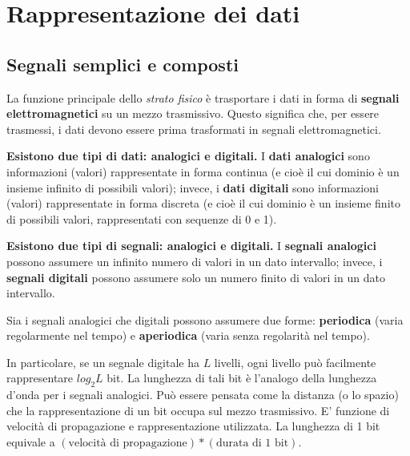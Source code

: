 \section{Rappresentazione dei dati}

    \subsection{Segnali semplici e composti}
    
        La funzione principale dello \textit{strato fisico} è trasportare i dati in forma di \textbf{segnali elettromagnetici} su un mezzo trasmissivo. Questo significa che, per essere trasmessi, i dati devono essere prima trasformati in segnali elettromagnetici.
        
        \vspace{3mm}
        
       \textbf{ Esistono due tipi di dati: analogici e digitali.} I \textbf{dati analogici} sono informazioni (valori) rappresentate in forma continua (e cioè il cui dominio è un insieme infinito di possibili valori); invece, i \textbf{dati digitali} sono informazioni (valori) rappresentate in forma discreta (e cioè il cui dominio è un insieme finito di possibili valori, rappresentati con sequenze di 0 e 1).
        
        \vspace{3mm}
        
        \textbf{Esistono due tipi di segnali: analogici e digitali.} I \textbf{segnali analogici} possono assumere un infinito numero di valori in un dato intervallo; invece, i \textbf{segnali digitali} possono assumere solo un numero finito di valori in un dato intervallo.
        
        \vspace{3mm}
        
        Sia i segnali analogici che digitali possono assumere due forme: \textbf{periodica} (varia regolarmente nel tempo) e \textbf{aperiodica} (varia senza regolarità nel tempo).
        
        \vspace{3mm}
        
        In particolare, se un segnale digitale ha \(L\) livelli, ogni livello può facilmente rappresentare \(log_2 L\) bit. La lunghezza di tali bit è l'analogo della lunghezza d'onda per i segnali analogici. Può essere pensata come la distanza (o lo spazio) che la rappresentazione di un bit occupa sul mezzo trasmissivo. E' funzione di velocità di propagazione e rappresentazione utilizzata. La lunghezza di 1 bit equivale a \((\text{velocità di propagazione})*(\text{durata di 1 bit})\).
        
